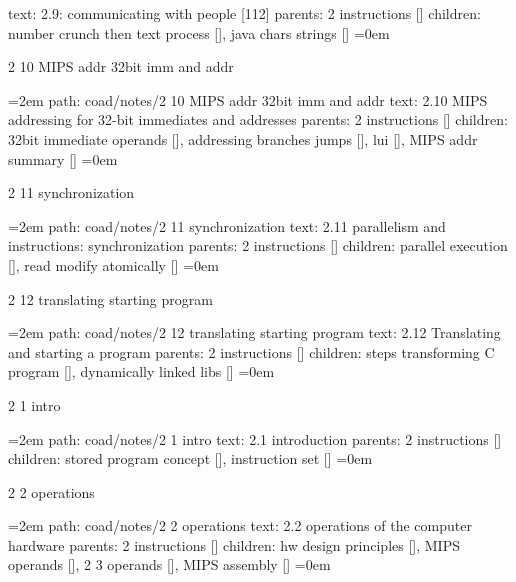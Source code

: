 \smallskip
text:  2.9: communicating with people [112]
\smallskip
parents:  2 instructions []
\smallskip
children: number crunch then text process [], java chars strings []
\smallskip
\leftskip=0em
\par\endgroup
\bigskip
{}
2 10 MIPS addr 32bit imm and addr
\smallskip
\par\begingroup
\leftskip=2em
path: coad/notes/2 10 MIPS addr 32bit imm and addr
\smallskip
text:  2.10 MIPS addressing for 32-bit immediates and addresses
\smallskip
parents:  2 instructions []
\smallskip
children: 32bit immediate operands [], addressing branches jumps [], lui [], MIPS addr summary []
\smallskip
\leftskip=0em
\par\endgroup
\bigskip
{}
2 11 synchronization
\smallskip
\par\begingroup
\leftskip=2em
path: coad/notes/2 11 synchronization
\smallskip
text:  2.11 parallelism and instructions: synchronization
\smallskip
parents:  2 instructions []
\smallskip
children: parallel execution [], read modify atomically []
\smallskip
\leftskip=0em
\par\endgroup
\bigskip
{}
2 12 translating starting program
\smallskip
\par\begingroup
\leftskip=2em
path: coad/notes/2 12 translating starting program
\smallskip
text:  2.12 Translating and starting a program
\smallskip
parents:  2 instructions []
\smallskip
children: steps transforming C program [], dynamically linked libs []
\smallskip
\leftskip=0em
\par\endgroup
\bigskip
{}
2 1 intro
\smallskip
\par\begingroup
\leftskip=2em
path: coad/notes/2 1 intro
\smallskip
text:  2.1 introduction
\smallskip
parents:  2 instructions []
\smallskip
children: stored program concept [], instruction set []
\smallskip
\leftskip=0em
\par\endgroup
\bigskip
{}
2 2 operations
\smallskip
\par\begingroup
\leftskip=2em
path: coad/notes/2 2 operations
\smallskip
text:  2.2 operations of the computer hardware
\smallskip
parents:  2 instructions []
\smallskip
children: hw design principles [], MIPS operands [], 2 3 operands [], MIPS assembly []
\smallskip
\leftskip=0em
\par\endgroup
